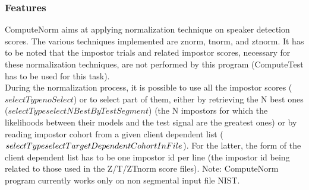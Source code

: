 \documentclass[a4paper]{article}
\begin{document}
\subsubsection{Features}
ComputeNorm aims at applying normalization technique on speaker
detection scores. The various techniques implemented are znorm,
tnorm, and ztnorm. It has to be noted that the impostor trials and
related impostor scores, necessary for these normalization
techniques, are not performed by this program (ComputeTest has to be used for this task).\\
During the normalization process, it is possible to use all the
impostor scores ($selectType noSelect$) or to select part of them,
either by retrieving the N best ones ($selectType
selectNBestByTestSegment$) (the N impostors for which the
likelihoods between their models and the test signal are the
greatest ones) or by reading impostor cohort from a given client
dependent list ($selectType selectTarget\-DependentCohortInFile$).
For the latter, the form of the client dependent list has to be one
impostor id per line (the impostor id being related to those used in
the Z/T/ZTnorm score files). Note: ComputeNorm program currently
works only on non segmental input file NIST.
\end{document}
